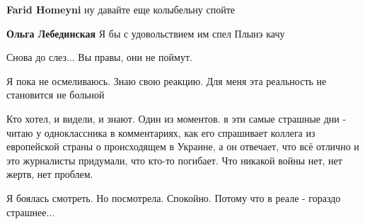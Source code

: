 \begin{itemize}
\begin{itemize}
 
\textbf{Farid Homeyni} ну давайте еще колыбельну спойте

 
\textbf{Ольга Лебединская} Я бы с удовольствием им спел Плынэ качу
\end{itemize}

 
Снова до слез... Вы правы, они не поймут.

\begin{itemize}
 
Я пока не осмеливаюсь. Знаю свою реакцию. Для меня эта реальность не становится не больной
\end{itemize}

 

Кто хотел, и видели, и знают. Один из моментов. в эти самые страшные дни -
читаю у одноклассника в комментариях, как его спрашивает коллега из европейской
страны о происходящем в Украине, а он отвечает, что всё отлично и это
журналисты придумали, что кто-то погибает. Что никакой войны нет, нет жертв,
нет проблем.

 
Я боялась смотреть. Но посмотрела. Спокойно. Потому что в реале - гораздо страшнее...


\end{itemize}
